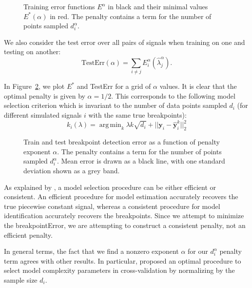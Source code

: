\documentclass{jsfds} %
\newcommand{\fig}[3][H]{
  \begin{figure}[#1]
    \hskip -1cm
    
    \caption{#3}
    \label{fig:#2}
  \end{figure}
}
\DeclareMathOperator*{\argmin}{arg\,min}
\begin{document}
\fig{variable-density-error-train}{Training error functions $E^\alpha$
  in black and their minimal values $E^*(\alpha)$ in red. The penalty
  contains a term for the number of points sampled $d_i^\alpha$.}

\newpage

We also consider the test error over all pairs of signals when
training on one and testing on another:
\begin{equation}
  \label{eq:lerr_test}
  \text{TestErr}(\alpha) = 
  \sum_{i\neq j} E^\alpha_i(\hat \lambda_j^\alpha).
\end{equation}

In Figure~\ref{fig:variable-density-error-alpha}, we plot $E^*$ and
TestErr for a grid of $\alpha$ values.  It is clear that the optimal
penalty is given by $\alpha=1/2$. This corresponds to the following
model selection criterion which is invariant to the number of data
points sampled $d_i$ (for different simulated signals $i$ with the
same true breakpoints):
\begin{equation}
  \label{eq:var_dens_opt_pen}
  k_i(\lambda) = 
  \argmin_k \lambda k \sqrt{d_i}+||\mathbf y_i-\mathbf{\hat y}_i^k||^2_2
\end{equation}

\fig{variable-density-error-alpha}{Train and test breakpoint detection
  error as a function of penalty exponent $\alpha$. The penalty
  contains a term for the number of points sampled $d_i^\alpha$. Mean
  error is drawn as a black line, with one standard deviation shown as
  a grey band.}

\newpage

As explained by \citet{sylvain-survey}, a model selection procedure
can be either efficient or consistent. An efficient procedure for
model estimation accurately recovers the true piecewise constant signal, whereas a
consistent procedure for model identification accurately recovers the
breakpoints. Since we attempt to minimize the breakpointError, we are
attempting to construct a consistent penalty, not an efficient
penalty.

In general terms, the fact that we find a nonzero exponent $\alpha$
for our $d_i^\alpha$ penalty term agrees with other results. In
particular, \citet{vfold} proposed an optimal procedure to select model
complexity parameters in cross-validation by normalizing by the sample
size $d_i$. 
\end{document}
